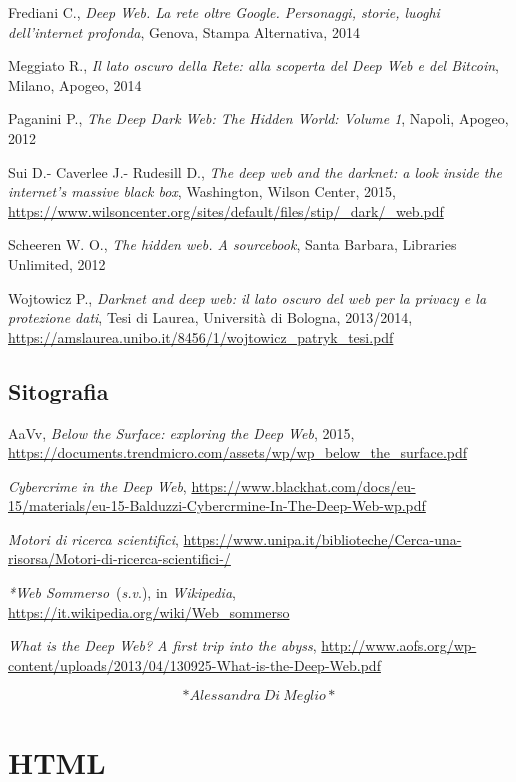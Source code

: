 \documentclass[
  b5paper,
  twoside,
  12pt,
  chapterprefix=false,
  bibliography=totocnumbered,
  parskip=false]{scrbook}
\begin{document}
Frediani C., \emph{Deep Web. La rete oltre Google. Personaggi, storie, luoghi
dell'internet profonda}, Genova, Stampa Alternativa, 2014

Meggiato R., \emph{Il lato oscuro della Rete: alla scoperta del Deep Web e
del Bitcoin}, Milano, Apogeo, 2014

Paganini P., \emph{The Deep Dark Web: The Hidden World: Volume 1}, Napoli,
Apogeo, 2012

Sui D.- Caverlee J.- Rudesill D., \emph{The deep web and the darknet: a look
inside the internet's massive black box}, Washington, Wilson Center,
2015,
\url{https://www.wilsoncenter.org/sites/default/files/stip/_dark/_web.pdf}

Scheeren W. O., \emph{The hidden web. A sourcebook}, Santa Barbara, Libraries
Unlimited, 2012

Wojtowicz P., \emph{Darknet and deep web: il lato oscuro del web per la
privacy e la protezione dati}, Tesi di Laurea, Università di Bologna,
2013/2014,
\url{https://amslaurea.unibo.it/8456/1/wojtowicz_patryk_tesi.pdf}

\hypertarget{sitografia-17}{%
\section*{Sitografia}\label{sitografia-17}}

AaVv, \emph{Below the Surface: exploring the Deep Web}, 2015,
\url{https://documents.trendmicro.com/assets/wp/wp_below_the_surface.pdf}

\emph{Cybercrime in the Deep Web},
\url{https://www.blackhat.com/docs/eu-15/materials/eu-15-Balduzzi-Cybercrmine-In-The-Deep-Web-wp.pdf}

\emph{Motori di ricerca scientifici},
\url{https://www.unipa.it/biblioteche/Cerca-una-risorsa/Motori-di-ricerca-scientifici-/}

\emph{*Web Sommerso}~(\emph{s.v}.), in \emph{Wikipedia},
\url{https://it.wikipedia.org/wiki/Web_sommerso}

\emph{What is the Deep Web? A first trip into the abyss},
\url{http://www.aofs.org/wp-content/uploads/2013/04/130925-What-is-the-Deep-Web.pdf}

\[*Alessandra~Di~Meglio*\]

\hypertarget{html}{%
\chapter{HTML}\label{html}}
\end{document}
